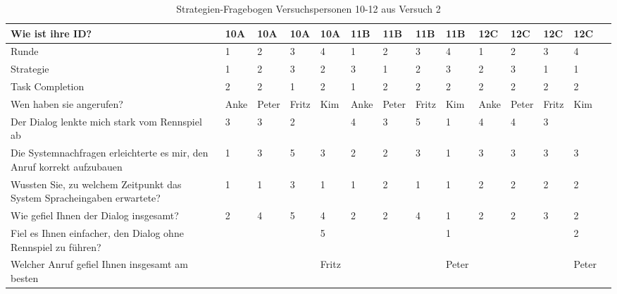 \documentclass[12pt,a4paper]{scrartcl}
\begin{document}
\begin{appendix}
\begin{table}
\caption{Strategien-Fragebogen Versuchspersonen 10-12 aus Versuch 2}
\begin{tabular}{|p{6cm}| p{0.8cm} | p{0.8cm} | p{0.8cm} | p{0.8cm} || p{0.8cm} | p{0.8cm} | p{0.8cm} | p{0.8cm} || p{0.8cm} | p{0.8cm} | p{0.8cm} | p{0.8cm} | p{} | }
\hline
	Wie ist ihre ID? & 10A & 10A & 10A & 10A & 11B & 11B & 11B & 11B & 12C & 12C & 12C & 12C \\ \hline \hline
	Runde & 1 & 2 & 3 & 4 & 1 & 2 & 3 & 4 & 1 & 2 & 3 & 4 \\ \hline
	Strategie & 1 & 2 & 3 & 2 & 3 & 1 & 2 & 3 & 2 & 3 & 1 & 1 \\ \hline \hline
	Task Completion & 2 & 2 & 1 & 2 & 1 & 2 & 2 & 2 & 2 & 2 & 2 & 2 \\ \hline \hline
	Wen haben sie angerufen? & Anke & Peter & Fritz & Kim & Anke & Peter & Fritz & Kim & Anke & Peter & Fritz & Kim \\ \hline
	Der Dialog lenkte mich stark vom Rennspiel ab & 3 & 3 & 2 &  & 4 & 3 & 5 & 1 & 4 & 4 & 3 &  \\ \hline
	Die Systemnachfragen erleichterte es mir, den Anruf korrekt aufzubauen & 1 & 3 & 5 & 3 & 2 & 2 & 3 & 1 & 3 & 3 & 3 & 3 \\ \hline
	Wussten Sie, zu welchem Zeitpunkt das System Spracheingaben erwartete? & 1 & 1 & 3 & 1 & 1 & 2 & 1 & 1 & 2 & 2 & 2 & 2 \\ \hline
	Wie gefiel Ihnen der Dialog insgesamt? & 2 & 4 & 5 & 4 & 2 & 2 & 4 & 1 & 2 & 2 & 3 & 2 \\ \hline
	Fiel es Ihnen einfacher, den Dialog ohne Rennspiel zu führen? &  &  &  & 5 &  &  &  & 1 &  &  &  & 2 \\ \hline
	Welcher Anruf gefiel Ihnen insgesamt am besten &  &  &  & Fritz &  &  &  & Peter  &  &  &  & Peter  \\ \hline
\end{tabular}
\end{table}


\end{appendix}
\end{document}
